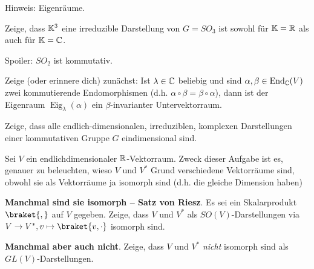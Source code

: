 \begin{sheet}
\begin{problem}[title={Kanonische Darstellung von $SO_2$}]
\begin{subproblem}
Hinweis: Eigenräume.
\end{subproblem}
\end{problem}

\begin{problem}[title={Die kanonische Darstellung von $SO_3$ ist irreduzibel}]\label{ex:fundamentaldarstellung_von_so3}
Zeige, dass $\mathbb{K}^3$ eine irreduzible Darstellung von $G=SO_3$ ist sowohl für $\mathbb{K}=\mathbb{R}$ als auch für $\mathbb{K}=\mathbb{C}$.
\end{problem}

\begin{problem}[title={Was geht bei $SO_2$ schief?}]
Spoiler: $SO_2$ ist kommutativ.

\begin{subproblem}
Zeige (oder erinnere dich) zunächst: Ist $\lambda\in\mathbb{C}$ beliebig und sind $\alpha,\beta\in\operatorname{End}_{\mathbb{C}}(V)$ zwei kommutierende Endomorphismen (d.h. $\alpha\circ\beta=\beta\circ\alpha$), dann ist der Eigenraum $\operatorname{Eig}_\lambda(\alpha)$ ein $\beta$-invarianter Untervektorraum.
\end{subproblem}
\begin{subproblem}
Zeige, dass alle endlich-dimensionalen, irreduziblen, komplexen Darstellungen einer kommutativen Gruppe $G$ eindimensional sind.
\end{subproblem}
\end{problem}

\begin{problem}[title={Isomorphie von $V$ und $V^\ast$}]
Sei $V$ ein endlichdimensionaler $\mathbb{R}$-Vektorraum. Zweck dieser Aufgabe ist es, genauer zu beleuchten, wieso $V$ und $V^\ast$ Grund verschiedene Vektorräume sind, obwohl sie als Vektorräume ja isomorph sind (d.h. die gleiche Dimension haben)
\begin{subproblem}
\textbf{Manchmal sind sie isomorph -- Satz von Riesz}.
Es sei ein Skalarprodukt $\braket{,}$ auf $V$ gegeben. Zeige, dass $V$ und $V^\ast$ als $SO(V)$-Darstellungen via $V\to V^\ast, v\mapsto \braket{v,\cdot}$ isomorph sind.
\end{subproblem}
\begin{subproblem}[difficulty={schwerer als man denkt}]
\textbf{Manchmal aber auch nicht}.
Zeige, dass $V$ und $V^\ast$ \emph{nicht} isomorph sind als $GL(V)$-Darstellungen.
\end{subproblem}
\end{problem}
	
\end{sheet}